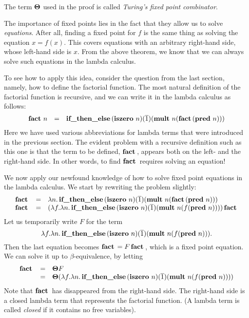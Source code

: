 \documentclass{article}
\begin{document}
The term $\textbf{\boldmath $\Theta$}$ used in the proof is called {\em Turing's fixed point
  combinator}. 

The importance of fixed points lies in the fact that they allow us to
solve {\em equations}. After all, finding a fixed point for $f$ is the
same thing as solving the equation $x = f(x)$. This covers equations
with an arbitrary right-hand side, whose left-hand side is $x$. From
the above theorem, we know that we can always solve such equations in
the lambda calculus.

To see how to apply this idea, consider the question from the last
section, namely, how to define the factorial function. The most
natural definition of the factorial function is recursive, and we can
write it in the lambda calculus as follows:
\[ \begin{array}{rcl} 
  \mathop{\textbf{\bf fact}\,} n &=& \mathop{\textbf{\bf if\_then\_else}\,} (\mathop{\textbf{\bf iszero}\,} n) (\mathop{\overline{1}}) (\mathop{\textbf{\bf mult}\,} n (\mathop{\textbf{\bf fact}\,}
  (\mathop{\textbf{\bf pred}\,} n)))
 \end{array}
 \]
Here we have used various abbreviations for lambda terms that were
introduced in the previous section. The evident problem with a
recursive definition such as this one is that the term to be defined,
$\mathop{\textbf{\bf fact}\,}$, appears both on the left- and the right-hand side. In other
words, to find $\mathop{\textbf{\bf fact}\,}$ requires solving an equation!

We now apply our newfound knowledge of how to solve fixed point equations
in the lambda calculus. We start by rewriting the problem slightly:
\[ \begin{array}{rcl} 
  \mathop{\textbf{\bf fact}\,} &=& \lambda n.\mathop{\textbf{\bf if\_then\_else}\,} (\mathop{\textbf{\bf iszero}\,} n) (\mathop{\overline{1}}) (\mathop{\textbf{\bf mult}\,} n (\mathop{\textbf{\bf fact}\,}
  (\mathop{\textbf{\bf pred}\,} n))) \\
  \mathop{\textbf{\bf fact}\,} &=& (\lambda f.\lambda n.\mathop{\textbf{\bf if\_then\_else}\,} (\mathop{\textbf{\bf iszero}\,} n) (\mathop{\overline{1}})
  (\mathop{\textbf{\bf mult}\,} n (f (\mathop{\textbf{\bf pred}\,} n)))) \mathop{\textbf{\bf fact}\,}
\end{array}
\]
Let us temporarily write $F$ for the term 
\[ \lambda f.\lambda n.\mathop{\textbf{\bf if\_then\_else}\,} (\mathop{\textbf{\bf iszero}\,} n) (\mathop{\overline{1}}) (\mathop{\textbf{\bf mult}\,} n (f
   (\mathop{\textbf{\bf pred}\,} n))). 
\]
Then the last equation becomes $\mathop{\textbf{\bf fact}\,} = F \mathop{\textbf{\bf fact}\,}$, which is a
fixed point equation. We can solve it up to $\beta$-equivalence, by
letting
\[ \begin{array}{rcl} 
  \mathop{\textbf{\bf fact}\,} &=& \textbf{\boldmath $\Theta$} F \\
  &=& \textbf{\boldmath $\Theta$} (\lambda f.\lambda n.\mathop{\textbf{\bf if\_then\_else}\,} (\mathop{\textbf{\bf iszero}\,} n) (\mathop{\overline{1}})
  (\mathop{\textbf{\bf mult}\,} n (f (\mathop{\textbf{\bf pred}\,} n))))
\end{array}
\]
Note that $\mathop{\textbf{\bf fact}\,}$ has disappeared from the right-hand side. The
right-hand side is a closed lambda term that represents the factorial
function. (A lambda term is called {\em closed} if it contains no free
variables).
\end{document}
